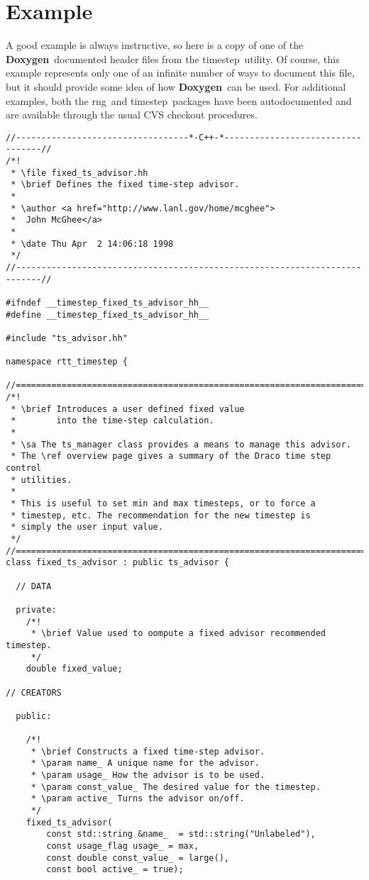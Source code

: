 \documentclass[11pt]{nmemo}
\newcommand{\doxy}{{\normalfont\bfseries Doxygen}}
\newcommand{\rng}{{\normalfont\sffamily rng}}
\newcommand{\timestep}{{\normalfont\sffamily timestep}}
\begin{document}

\section{Example}

A good example is always instructive, so here is a copy of
one of the \doxy\ documented header files from the \timestep\ utility.
Of course, this example represents only one of an infinite number of ways
to document this file, but it should provide some idea of how \doxy\
can be used.
For additional examples, both the \rng\ and \timestep\ packages have been
autodocumented and are available through the usual CVS checkout procedures.

\begin{verbatim}
//----------------------------------*-C++-*----------------------------------//
/*! 
 * \file fixed_ts_advisor.hh
 * \brief Defines the fixed time-step advisor.
 *
 * \author <a href="http://www.lanl.gov/home/mcghee">
 *  John McGhee</a>
 *
 * \date Thu Apr  2 14:06:18 1998
 */
//---------------------------------------------------------------------------//

#ifndef __timestep_fixed_ts_advisor_hh__
#define __timestep_fixed_ts_advisor_hh__

#include "ts_advisor.hh"

namespace rtt_timestep {

//===========================================================================//
/*!
 * \brief Introduces a user defined fixed value 
 *        into the time-step calculation.
 *
 * \sa The ts_manager class provides a means to manage this advisor.
 * The \ref overview page gives a summary of the Draco time step control
 * utilities. 
 *
 * This is useful to set min and max timesteps, or to force a
 * timestep, etc. The recommendation for the new timestep is
 * simply the user input value. 
 */ 
//===========================================================================//
class fixed_ts_advisor : public ts_advisor {

  // DATA

  private:
    /*!
     * \brief Value used to oompute a fixed advisor recommended timestep.
     */
    double fixed_value; 
   
// CREATORS

  public:

    /*!
     * \brief Constructs a fixed time-step advisor.
     * \param name_ A unique name for the advisor.
     * \param usage_ How the advisor is to be used.
     * \param const_value_ The desired value for the timestep.
     * \param active_ Turns the advisor on/off.
     */
    fixed_ts_advisor( 
        const std::string &name_  = std::string("Unlabeled"),
        const usage_flag usage_ = max, 
        const double const_value_ = large(),
        const bool active_ = true);


\end{verbatim}
\end{document}
